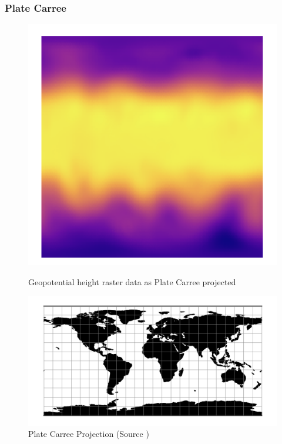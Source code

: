 \newpage

\subsubsection*{Plate Carree}

\begin{figure}[h]
    \centering
    \begin{minipage}{0.30\textwidth}
        \centering
        \includegraphics[width=0.9\linewidth]{figures/chapter-8/plate_caree_geopoth_raster.png}
        \caption{ Geopotential height raster data as Plate Carree projected}
        \label{fig:eqc_geopoth_raster}
    \end{minipage}\hfill
    \begin{minipage}{0.30\textwidth}
        \centering
        \includegraphics[width=0.9\linewidth]{figures/chapter-8/eqc.png}
        \caption{Plate Carree Projection (Source \cite{PROJ_SITE})}

\end{minipage}
\end{figure}
